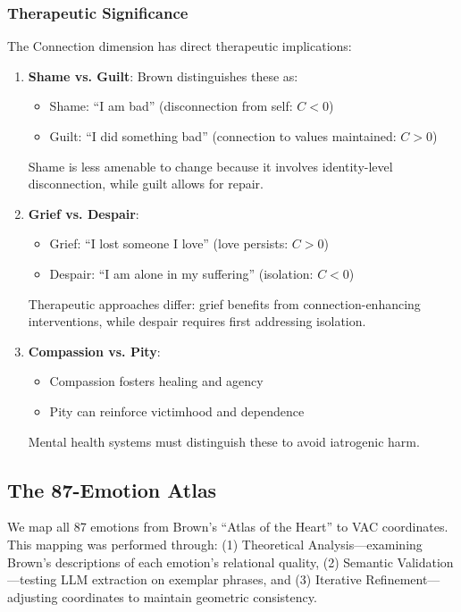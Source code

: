 \subsubsection{Therapeutic Significance}

The Connection dimension has direct therapeutic implications:

\begin{enumerate}
    \item \textbf{Shame vs. Guilt}: Brown distinguishes these as:
    \begin{itemize}
        \item Shame: ``I am bad'' (disconnection from self: $C < 0$)
        \item Guilt: ``I did something bad'' (connection to values maintained: $C > 0$)
    \end{itemize}
    Shame is less amenable to change because it involves identity-level disconnection, while guilt allows for repair.

    \item \textbf{Grief vs. Despair}:
    \begin{itemize}
        \item Grief: ``I lost someone I love'' (love persists: $C > 0$)
        \item Despair: ``I am alone in my suffering'' (isolation: $C < 0$)
    \end{itemize}
    Therapeutic approaches differ: grief benefits from connection-enhancing interventions, while despair requires first addressing isolation.

    \item \textbf{Compassion vs. Pity}:
    \begin{itemize}
        \item Compassion fosters healing and agency
        \item Pity can reinforce victimhood and dependence
    \end{itemize}
    Mental health systems must distinguish these to avoid iatrogenic harm.
\end{enumerate}

\subsection{The 87-Emotion Atlas}

We map all 87 emotions from Brown's ``Atlas of the Heart'' to VAC coordinates. This mapping was performed through: (1) Theoretical Analysis—examining Brown's descriptions of each emotion's relational quality, (2) Semantic Validation—testing LLM extraction on exemplar phrases, and (3) Iterative Refinement—adjusting coordinates to maintain geometric consistency.

